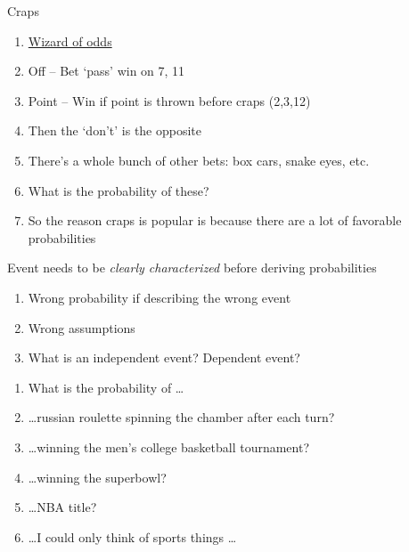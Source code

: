 \documentclass[aspectratio=1610,pdftex,dvipsnames,compress,xcolor={dvipsnames}]{beamer}
\begin{document}
\begin{frame}{Craps}
    \begin{enumerate}[series=outerlist,topsep=0pt,itemsep=15pt,leftmargin=*,label=(\arabic*)]
        \item[]\href{http://wizardofodds.com/play/craps/v2/}{Wizard of odds}
        \item[]Off -- Bet `pass' win on 7, 11
        \item[]Point -- Win if point is thrown before craps (2,3,12)
        \item[]Then the `don't' is the opposite
        \item[]There's a whole bunch of other bets: box cars, snake eyes, etc.
        \item[]What is the probability of these?
        \item[]So the reason craps is popular is because there are a lot of favorable probabilities
    \end{enumerate}
\end{frame}


\begin{frame}{Event needs to be \textit{clearly characterized} before deriving probabilities}
    \begin{enumerate}[series=outerlist,topsep=0pt,itemsep=11pt,leftmargin=*,label=(\arabic*)]
        \item[]Wrong probability if describing the wrong event  
        \item[]Wrong assumptions
        \item[]What is an independent event? Dependent event?
    \end{enumerate}

    \vspace{0.25in}

    \begin{enumerate}[series=outerlist,topsep=0pt,itemsep=11pt,leftmargin=*,label=(\arabic*)]
        \item[] What is the probability of \ldots
        \item\ldots russian roulette spinning the chamber after each turn?
        \item\ldots winning the men's college basketball tournament?
        \item\ldots winning the superbowl?
        \item\ldots NBA title?
        \item\ldots I could only think of sports things \ldots
    \end{enumerate}
\end{frame}
\end{document}
